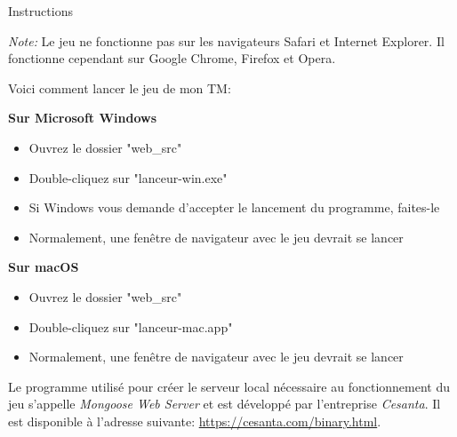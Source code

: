 \documentclass[10pt,a4paper]{article}
\begin{document}

\begin{center}
{\Huge Instructions}
\end{center}

\textit{Note: } Le jeu ne fonctionne pas sur les navigateurs Safari et Internet Explorer. Il fonctionne cependant sur Google Chrome, Firefox et Opera.

\vspace{15pt}

Voici comment lancer le jeu de mon TM:

\vspace{10pt}

\textbf{Sur Microsoft Windows}
\begin{itemize}
\item Ouvrez le dossier "web\_src"
\item Double-cliquez sur "lanceur-win.exe"
\item Si Windows vous demande d'accepter le lancement du programme, faites-le
\item Normalement, une fenêtre de navigateur avec le jeu devrait se lancer
\end{itemize}

\vspace{15pt}

\textbf{Sur macOS}
\begin{itemize}
\item Ouvrez le dossier "web\_src"
\item Double-cliquez sur "lanceur-mac.app"
\item Normalement, une fenêtre de navigateur avec le jeu devrait se lancer
\end{itemize}

\vspace{15pt}

Le programme utilisé pour créer le serveur local nécessaire au fonctionnement du jeu s'appelle \textit{Mongoose Web Server} et est développé par l'entreprise \textit{Cesanta}. Il est disponible à l'adresse suivante: \url{https://cesanta.com/binary.html}.
\end{document}
